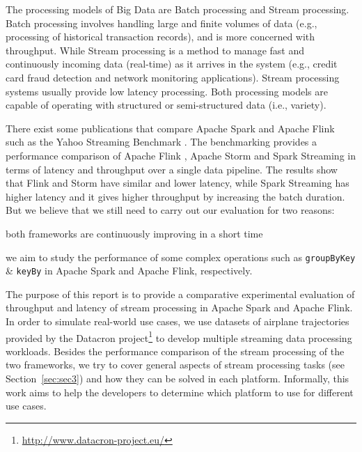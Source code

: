 \documentclass[]{article}
\begin{document}
\par The processing models of Big Data are Batch processing and Stream processing. Batch processing involves handling  large and finite volumes of data (e.g., processing of historical transaction records), and is more concerned with throughput. While Stream processing  is a method to manage fast and continuously incoming data (real-time) as it arrives in the system (e.g., credit card fraud detection and network monitoring applications). Stream processing systems usually  provide low latency processing. Both processing models are capable of operating with structured or semi-structured data (i.e., variety).

\par There exist some publications that compare Apache Spark and Apache Flink
 such as the Yahoo Streaming Benchmark \cite{yahoo}. The benchmarking provides a performance comparison of Apache Flink , Apache Storm \cite{sortm} and  Spark Streaming in terms of latency and throughput over a single data pipeline. The results show that Flink and Storm have similar and lower latency, while Spark Streaming has higher latency and it gives higher throughput by increasing the batch duration. But we believe that we still need to carry out our evaluation for two reasons: \begin{enumerate*}[label=(\roman*)]
\item both frameworks are continuously improving in a short time 
\item we aim to study the performance of some complex operations such as \texttt{groupByKey} \& \texttt{keyBy} in Apache Spark and Apache Flink, respectively.
\end{enumerate*}

 

\par The purpose of this report is to provide a comparative experimental evaluation of throughput and latency of stream processing in Apache Spark and Apache Flink. In order to simulate real-world use cases, we use datasets of airplane trajectories provided by the  Datacron project\footnote{\url{http://www.datacron-project.eu/}} to develop multiple streaming data processing workloads. Besides the performance comparison of the stream processing of the two frameworks, we try to cover general aspects of stream processing tasks (see Section~\ref{sec:sec3}) and how they can be solved in each platform. Informally,  this work aims to help the developers to determine which platform to use for different use cases. 
\end{document}
